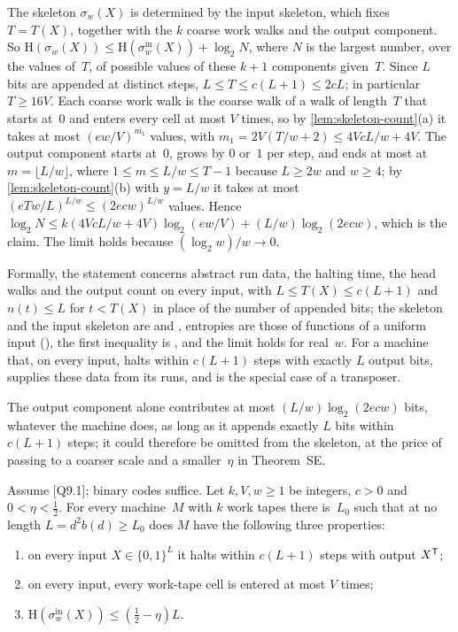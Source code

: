 \begin{outline}
The skeleton $\sigma_w(X)$ is determined by the input skeleton, which fixes $T=T(X)$, together with the $k$ coarse work
walks and the output component. So $\mathrm H(\sigma_w(X))\le\mathrm H(\sigma^{\mathrm{in}}_w(X))+\log_2N$, where $N$ is
the largest number, over the values of~$T$, of possible values of these $k+1$ components given~$T$. Since $L$ bits are
appended at distinct steps, $L\le T\le c(L+1)\le2cL$; in particular $T\ge16V$. Each coarse work walk is the coarse walk
of a walk of length~$T$ that starts at~$0$ and enters every cell at most $V$ times, so by \cref{lem:skeleton-count}(a)
it takes at most $(ew/V)^{m_1}$ values, with $m_1=2V(T/w+2)\le4VcL/w+4V$. The output component starts at~$0$,
grows by $0$ or~$1$ per step, and ends at most at $m=\lfloor L/w\rfloor$, where $1\le m\le L/w\le T-1$ because $L\ge2w$
and $w\ge4$; by \cref{lem:skeleton-count}(b) with $y=L/w$ it takes at most $(eTw/L)^{L/w}\le(2ecw)^{L/w}$ values. Hence
$\log_2N\le k(4VcL/w+4V)\log_2(ew/V)+(L/w)\log_2(2ecw)$, which is the claim. The limit holds because $(\log_2w)/w\to0$.

Formally, the statement concerns abstract run data, the halting time, the head walks and the output count on every
input, with $L\le T(X)\le c(L+1)$ and $n(t)\le L$ for $t<T(X)$ in place of the number of appended bits; the skeleton and
the input skeleton are  and , entropies are those of functions of a
uniform input (), the first inequality is , and the limit
holds for real~$w$. For a machine that, on every input, halts within $c(L+1)$ steps with exactly $L$ output bits,
 supplies these data from its runs, and
 is the special case of a transposer.
\end{outline}

The output component alone contributes at most $(L/w)\log_2(2ecw)$ bits, whatever the machine does, as long as it
appends exactly $L$ bits within $c(L+1)$ steps; it could therefore be omitted from the skeleton, at the price of passing
to a coarser scale and a smaller~$\eta$ in Theorem~SE.

\begin{corollary}\label{cor:IS}
Assume [Q9.1]; binary codes suffice. Let $k,V,w\ge1$ be integers, $c>0$ and $0<\eta<\frac12$. For every machine~$M$
with $k$ work tapes there is~$L_0$ such that at no length $L=d^2b(d)\ge L_0$ does $M$ have the following three
properties:
\begin{enumerate}[label=(\roman*)]
\item on every input $X\in\{0,1\}^L$ it halts within $c(L+1)$ steps with output $X^{\mathsf{T}}$;
\item on every input, every work-tape cell is entered at most $V$ times;
\item $\mathrm H(\sigma^{\mathrm{in}}_w(X))\le(\frac12-\eta)L$.
\end{enumerate}
\end{corollary}

